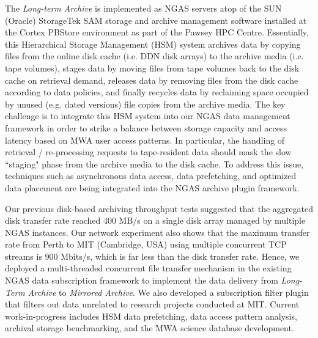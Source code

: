 The \emph{Long-term Archive} is implemented as NGAS servers atop of the SUN (Oracle) StorageTek SAM storage and archive management software installed at the Cortex PBStore environment as part of the Pawsey HPC Centre. Essentially, this Hierarchical Storage Management (HSM) system archives data by copying files from the online disk cache (i.e. DDN disk arrays) to the archive media (i.e. tape volumes), stages data by moving files from tape volumes back to the disk cache on retrieval demand, releases data by removing files from the disk cache according to data policies, and finally recycles data by reclaiming space occupied by unused (e.g. dated versions) file copies from the archive media. The key challenge is to integrate this HSM system into our NGAS data management framework in order to strike a balance between storage capacity and access latency based on MWA user access patterns. In particular, the handling of retrieval / re-processing requests to tape-resident data should mask the slow ``staging" phase from the archive media to the disk cache. To address this issue, techniques such as asynchronous data access, data prefetching, and optimized data placement are being integrated into the NGAS archive plugin framework.  

Our previous disk-based archiving throughput tests \citet{wiceneca2012mwa} suggested that the aggregated disk transfer rate reached 400 MB/s on a single disk array managed by multiple NGAS instances. Our network experiment also shows that the maximum transfer rate from Perth to MIT (Cambridge, USA) using multiple concurrent TCP streams is 900 Mbits/s, which is far less than the disk transfer rate. Hence, we deployed a multi-threaded concurrent file transfer mechanism in the existing NGAS data subscription framework to implement the data delivery from \emph{Long-Term Archive} to \emph{Mirrored Archive}. We also developed a subscription filter plugin that filters out data unrelated to research projects conducted at MIT. Current work-in-progress includes HSM data prefetching, data access pattern analysis, archival storage benchmarking, and the MWA science database development.


